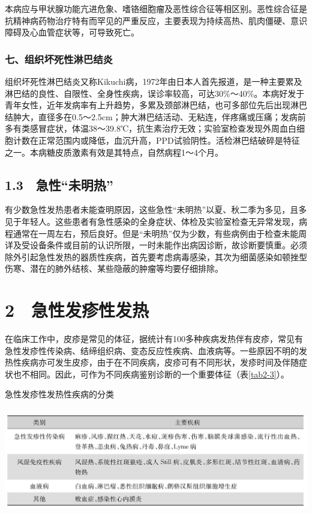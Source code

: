 本病应与甲状腺功能亢进危象、嗜铬细胞瘤及恶性综合征等相区别。恶性综合征是抗精神病药物治疗特有而罕见的严重反应，主要表现为持续高热、肌肉僵硬、意识障碍及心血管症状等，可导致死亡。

\subsubsection{七、组织坏死性淋巴结炎}

组织坏死性淋巴结炎又称Kikuchi病，1972年由日本人首先报道，是一种主要累及淋巴结的良性、自限性、全身性疾病，误诊率较高，可达30\%～40\%。本病好发于青年女性，近年发病率有上升趋势，多累及颈部淋巴结，也可多部位先后出现淋巴结肿大，直径多在0.5～2.5cm；肿大淋巴结活动、无粘连，伴疼痛或压痛；发病前多有类感冒症状，体温38～39.8℃，抗生素治疗无效；实验室检查发现外周血白细胞计数在正常范围内或降低，血沉升高，PPD试验阴性。活检淋巴结破碎是特征之一。本病糖皮质激素有效是其特点，自然病程1～4个月。

\protect\hypertarget{text00020.html}{}{}

\subsection{1.3　急性“未明热”}

有少数急性发热患者未能查明原因，这些急性“未明热”以夏、秋二季为多见，且多见于年轻人。这些患者有急性感染的全身症状、体检及实验室检查无异常发现，病程通常在一周左右，预后良好。但是“未明热”仅为少数，有些病例由于检查未能周详及受设备条件或目前的认识所限，一时未能作出病因诊断，故诊断要慎重。必须除外引起急性发热的器质性疾病，首先要考虑病毒感染，其次为细菌感染如顿挫型伤寒、潜在的肺外结核、某些隐蔽的肿瘤等均要仔细排除。

\protect\hypertarget{text00021.html}{}{}

\section{2　急性发疹性发热}

在临床工作中，皮疹是常见的体征，据统计有100多种疾病发热伴有皮疹，常见有急性发疹性传染病、结缔组织病、变态反应性疾病、血液病等。一些原因不明的发热性疾病亦可发生皮疹，由于在不同疾病，皮疹可有不同形状，发疹时间及伴随症状也不相同。因此，可作为不同疾病鉴别诊断的一个重要体征（表\ref{tab2-3}）。

\begin{table}[htbp]
\centering
\caption{急性发疹性发热性疾病的分类}
\label{tab2-3}
\includegraphics[width=5.9375in,height=1.84375in]{./images/Image00007.jpg}
\end{table}

